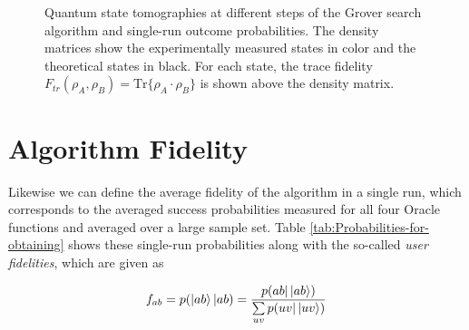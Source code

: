 \begin{figure}
	\centering
	\caption[Quantum state tomographies at different steps during the Grover search algorithm and single-run outcome probabilities]{Quantum state tomographies at different steps of the Grover search algorithm and single-run outcome probabilities. The density matrices show the experimentally measured states in color and the theoretical states in black. For each state, the trace fidelity $F_{tr}(\rho_A,\rho_B) = \mathrm{Tr}\{\rho_A\cdot\rho_B\}$ is shown above the density matrix.}
	\label{fig:GroverAlgorithmExperimentalResults}
\end{figure}


\section{Algorithm Fidelity}

Likewise we can define the average fidelity of the algorithm in a single run, which corresponds to the averaged success probabilities measured for all four Oracle functions and averaged over a large sample set. Table \ref{tab:Probabilities-for-obtaining} shows these single-run probabilities along with the so-called {\it user fidelities}, which are given as

\begin{equation}
f_{ab} = p(\left| ab \right>|ab) = \frac{p(ab |\left| ab \right>)}{\sum\limits_{uv}p(uv|\left| uv \right>)} 
\end{equation}

